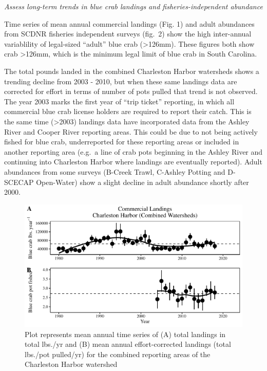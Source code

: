 \documentclass[
]{article}
\begin{document}
\emph{Assess long-term trends in blue crab landings and
fisheries-independent abundance}

Time series of mean annual commercial landings (Fig. 1) and adult
abundances from SCDNR fisheries independent surveys (fig.~2) show the
high inter-annual variablility of legal-sized ``adult'' blue crab
(\textgreater126mm). These figures both show crab \textgreater126mm,
which is the minimum legal limit of blue crab in South Carolina.

The total pounds landed in the combined Charleston Harbor watersheds
shows a trending decline from 2003 - 2010, but when these same landings
data are corrected for effort in terms of number of pots pulled that
trend is not observed. The year 2003 marks the first year of ``trip
ticket'' reporting, in which all commercial blue crab license holders
are required to report their catch. This is the same time
(\textgreater2003) landings data have incorporated data from the Ashley
River and Cooper River reporting areas. This could be due to not being
actively fished for blue crab, underreported for these reporting areas
or included in another reporting area (e.g.~a line of crab pots
beginning in the Ashley River and continuing into Charleston Harbor
where landings are eventually reported). Adult abundances from some
surveys (B-Creek Trawl, C-Ashley Potting and D-SCECAP Open-Water) show a
slight decline in adult abundance shortly after 2000.

\begin{figure}
\includegraphics[width=0.75\linewidth]{NEWCh1_Figs_files/figure-latex/Figure 1-1} \caption{Plot represents mean annual time series of (A) total landings in total lbs./yr and (B) mean annual effort-corrected landings (total lbs./pot pulled/yr) for the combined reporting areas of the Charleston Harbor watershed}\label{fig:Figure 1}
\end{figure}
\end{document}
